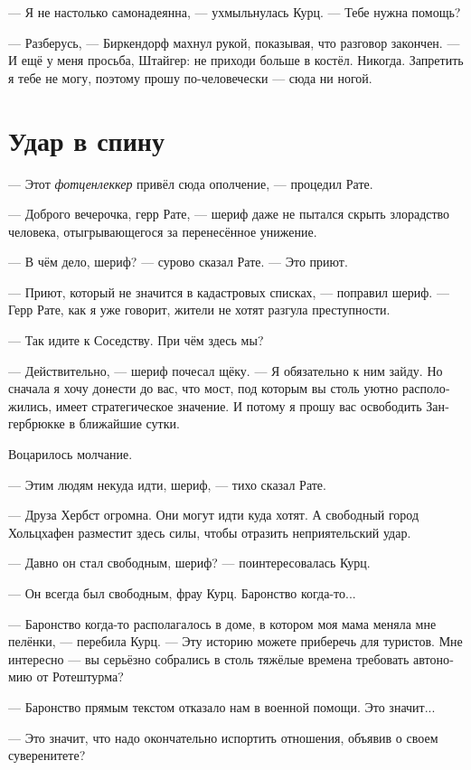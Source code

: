 \documentclass[a4paper,12pt,fleqn]{book}\usepackage{cooltooltips}\usepackage{polyglossia}\setdefaultlanguage[babelshorthands=true]{russian}\setotherlanguage{english}\defaultfontfeatures{Ligatures=TeX,Mapping=tex-text} \usepackage{xcolor}\definecolor{lightgray}{HTML}{bbbbbb}\color{lightgray}\newcommand{\ml}[3]{\textenglish{\textcolor{black}{#3}}}
\begin{document}
--- Я не настолько самонадеянна, --- ухмыльнулась Курц.
--- Тебе нужна помощь?

--- Разберусь, --- Биркендорф махнул рукой, показывая, что разговор закончен.
--- И ещё у меня просьба, Штайгер: не приходи больше в костёл.
Никогда.
Запретить я тебе не могу, поэтому прошу по-человечески --- сюда ни ногой.

\section{Удар в спину}

--- Этот \textit{фотценлеккер} привёл сюда ополчение, --- процедил Рате.

--- Доброго вечерочка, герр Рате, --- шериф даже не пытался скрыть злорадство человека, отыгрывающегося за перенесённое унижение.

--- В чём дело, шериф? --- сурово сказал Рате.
--- Это приют.

--- Приют, который не значится в кадастровых списках, --- поправил шериф.
--- Герр Рате, как я уже говорит, жители не хотят разгула преступности.

--- Так идите к Соседству.
При чём здесь мы?

--- Действительно, --- шериф почесал щёку.
--- Я обязательно к ним зайду.
Но сначала я хочу донести до вас, что мост, под которым вы столь уютно расположились, имеет стратегическое значение.
И потому я прошу вас освободить Зангербрюкке в ближайшие сутки.

Воцарилось молчание.

--- Этим людям некуда идти, шериф, --- тихо сказал Рате.

--- Друза Хербст огромна.
Они могут идти куда хотят.
А свободный город Хольцхафен разместит здесь силы, чтобы отразить неприятельский удар.

--- Давно он стал свободным, шериф? --- поинтересовалась Курц.

--- Он всегда был свободным, фрау Курц.
Баронство когда-то...

--- Баронство когда-то располагалось в доме, в котором моя мама меняла мне пелёнки, --- перебила Курц.
--- Эту историю можете приберечь для туристов.
Мне интересно --- вы серьёзно собрались в столь тяжёлые времена требовать автономию от Ротештурма?

--- Баронство прямым текстом отказало нам в военной помощи.
Это значит...

--- Это значит, что надо окончательно испортить отношения, объявив о своем суверенитете?
\end{document}
